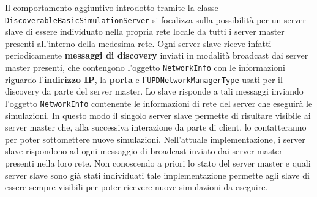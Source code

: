 Il comportamento aggiuntivo introdotto tramite la classe \texttt{DiscoverableBasicSimulationServer} si focalizza sulla possibilità per un server slave di essere individuato nella propria rete locale da tutti i server master
presenti all'interno della medesima rete. Ogni server slave riceve infatti periodicamente \textbf{messaggi di discovery} inviati in modalità broadcast dai server master presenti, che contengono l'oggetto \texttt{NetworkInfo} con le informazioni riguardo l'\textbf{indirizzo IP}, la \textbf{porta} e l'\texttt{UPDNetworkManagerType} usati per il discovery da parte del server master. Lo slave risponde a tali messaggi inviando l'oggetto \texttt{NetworkInfo} contenente le informazioni di rete del server che eseguirà le simulazioni. In questo modo il singolo server slave
permette di risultare visibile ai server master che, alla successiva interazione da parte di client, lo contatteranno per poter sottomettere nuove simulazioni.
Nell'attuale implementazione, i server slave rispondono ad ogni messaggio di broadcast inviato dai server master presenti nella loro rete. Non conoscendo a priori lo stato del server master e quali server slave sono già stati individuati
tale implementazione permette agli slave di essere sempre visibili per poter ricevere nuove simulazioni da eseguire.
